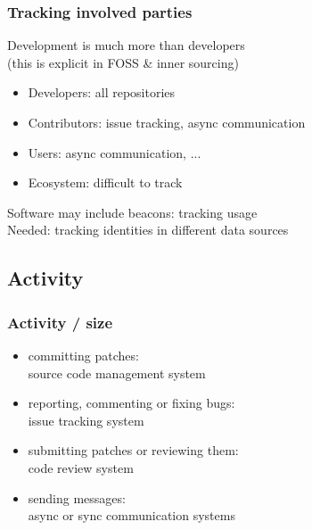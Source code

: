 \documentclass[17pt,aspectratio=169,hyperref=pdfusetitle]{beamer}
\begin{document}

\begin{frame}
\frametitle{Tracking involved parties}

  Development is much more than developers \\
  (this is explicit in FOSS \& inner sourcing)
  
  \begin{itemize}
  \item Developers: all repositories
  \item Contributors: issue tracking, async communication
  \item Users: async communication, ...
  \item Ecosystem: difficult to track
  \end{itemize}

  \vspace{1cm}
  
  Software may include beacons: tracking usage \\

  Needed: tracking identities in different data sources \\
\end{frame}

\subsection{Activity}


\begin{frame}
\frametitle{Activity / size}

  \begin{itemize}
  \item committing patches: \\
    source code management system
  \item reporting, commenting or fixing bugs: \\
    issue tracking system
  \item submitting patches or reviewing them: \\
    code review system
  \item sending messages: \\
    async or sync communication systems
  \end{itemize}
\end{frame}
\end{document}
